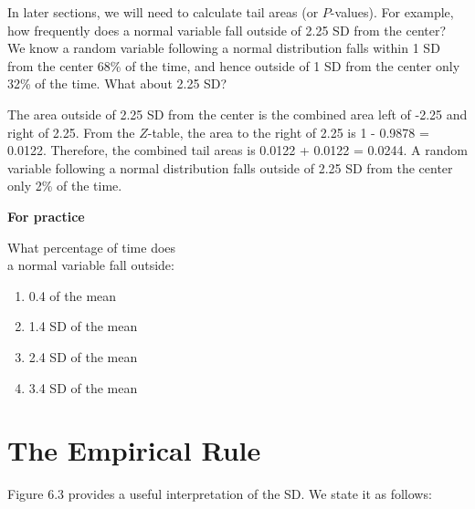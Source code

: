 \documentclass[11pt, chapterprefix=true]{scrbook}\usepackage[]{graphicx}\usepackage[]{color}
\begin{document}
In later sections, we will need to calculate tail areas (or $P$-values).  For example, how frequently does a normal variable fall outside of 2.25 SD from the center?  We know a random variable following a normal distribution falls within 1 SD from the center 68\% of the time, and hence outside of 1 SD from the center only 32\% of the time.  What about 2.25 SD?

The area outside of 2.25 SD from the center is the combined area left of -2.25 and right of 2.25.  From the $Z$-table, the area to the right of 2.25 is 1 - 0.9878 = 0.0122.  Therefore, the combined tail areas is 0.0122 + 0.0122 = 0.0244.  A random variable following a normal distribution falls outside of 2.25 SD from the center only 2\% of the time.

\begin{minipage}[ht]{3cm}

\textbf{For practice}
\end{minipage}
\begin{minipage}[ht]{6cm}

\parbox{6cm}{
  What percentage of time does \\ a normal variable fall outside:

  \begin{enumerate}
  \item 0.4 of the mean
  \item 1.4 SD of the mean
  \item 2.4 SD of the mean
  \item 3.4 SD of the mean
  \end{enumerate}
}
\end{minipage}

\section{The Empirical Rule}

Figure 6.3 provides a useful interpretation of the SD.  We state it as follows:

\begin{center}
\end{center}
\end{document}
